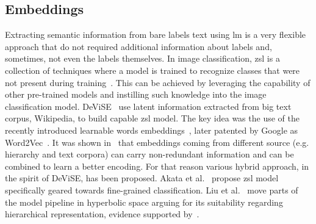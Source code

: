 \subsection{Embeddings}
\label{subsec:embeddings}

Extracting semantic information from bare labels text using \acrshort{lm} is a
very flexible approach that do not required additional information about labels
and, sometimes, not even the labels themselves. In image classification,
\acrfull{zsl} is a collection of techniques where a model is trained to
recognize classes that were not present during
training~\cite{AnIntroductionSoysal2020}. This can be achieved by leveraging
the capability of other pre-trained models and instilling such knowledge into
the image classification model. DeViSE~\cite{DeviseADeepFrome2013} use latent
information extracted from big text corpus, Wikipedia, to build capable
\acrshort{zsl} model. The key idea was the use of the recently introduced
learnable words embeddings~\cite{EfficientEstimMikolo2013,
DistributedRepMikolo2013}, later patented by Google as
Word2Vec~\cite{ComputingNumerMikolo2013}. It was shown
in~\cite{EvaluationOfOAkata2014, LabelEmbeddingAkata2015} that embeddings
coming from different source (e.g. hierarchy and text corpora) can carry
non-redundant information and can be combined to learn a better encoding. For
that reason various hybrid approach, in the spirit of DeViSE, has been
proposed. Akata et al.~\cite{EvaluationOfOAkata2014} propose \acrshort{zsl}
model specifically geared towards fine-grained classification. Liu et
al.~\cite{HyperbolicVisuLiuS2020} move parts of the model pipeline in
hyperbolic space arguing for its suitability regarding hierarchical
representation, evidence supported by~\cite{PoincareEmbeddNickel2017,
HyperbolicEntaGanea2018}.

